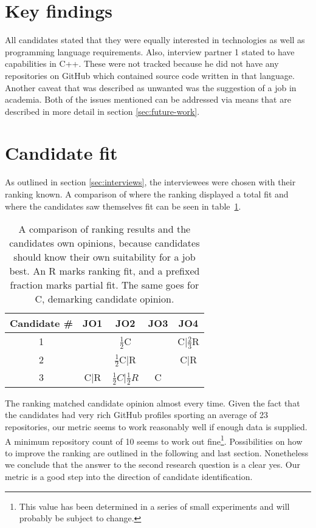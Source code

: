 \section{Key findings}\label{sec:key-findings}
All candidates stated that they were equally interested in technologies as well as programming language requirements. Also, interview partner 1 stated to have capabilities in C++. These were not tracked because he did not have any repositories on GitHub which contained source code written in that language. Another caveat that was described as unwanted was the suggestion of a job in academia. Both of the issues mentioned can be addressed via means that are described in more detail in section \ref{sec:future-work}.

\section{Candidate fit}
As outlined in section \ref{sec:interviews}, the interviewees were chosen with their ranking known. A comparison of where the ranking displayed a total fit and where the candidates saw themselves fit can be seen in table~\ref{table:rank-comparison}.

\begin{table}
\centering
\begin{tabular}{c|cccc}
Candidate \# & JO1 & JO2 & JO3 & JO4\\
\hline
           1 & & $\frac{1}{2}$C & & C|$\frac{2}{3}$R\\
           2 & & $\frac{1}{2}$C|R & & C|R\\
           3 & C|R & $\frac{1}{2}C$|$\frac{1}{2}R$ & C & \\
\end{tabular}
\caption{A comparison of ranking results and the candidates own opinions, because candidates should know their own suitability for a job best. An R marks ranking fit, and a prefixed fraction marks partial fit. The same goes for C, demarking candidate opinion.}
\label{table:rank-comparison}
\end{table}

The ranking matched candidate opinion almost every time. Given the fact that the candidates had very rich GitHub profiles sporting an average of 23 repositories, our metric seems to work reasonably well if enough data is supplied. A minimum repository count of 10 seems to work out fine\footnote{This value has been determined in a series of small experiments and will probably be subject to change.}. Possibilities on how to improve the ranking are outlined in the following and last section. Nonetheless we conclude that the answer to the second research question is a clear yes. Our metric is a good step into the direction of candidate identification.